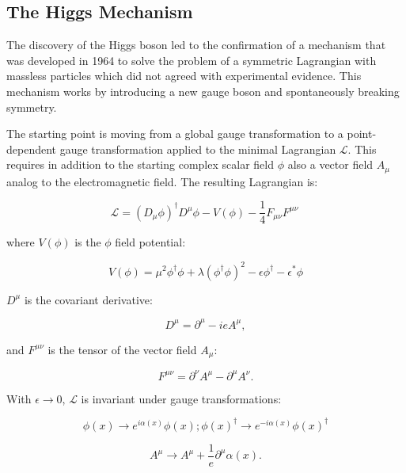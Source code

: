 \subsection{The Higgs Mechanism}
\label{higgs_mechanism}

The discovery of the Higgs boson led to the confirmation of a mechanism that was developed in 1964 to solve the problem of a symmetric Lagrangian with massless particles which did not agreed with experimental evidence. This mechanism works by introducing a new gauge boson and spontaneously breaking symmetry.

The starting point is moving from a global gauge transformation to a point-dependent gauge transformation applied to the minimal Lagrangian $\mathcal{L}$. This requires in addition to the starting complex scalar field $\phi$ also a vector field $A_{\mu}$ analog to the electromagnetic field. The resulting Lagrangian is:

\begin{equation}
\mathcal{L} = (D_{\mu}\phi)^{\dagger} D^{\mu}\phi - V (\phi) - \dfrac{1}{4}F_{\mu\nu}F^{\mu\nu}\
\label{eq::lagrangian_min}
\end{equation}

where $V(\phi)$ is the $\phi$ field potential:

\begin{equation}
V(\phi)=\mu^{2}\phi^{\dagger}\phi+\lambda(\phi^{\dagger}\phi)^{2} -\epsilon\phi^{\dagger} -\epsilon^{*}\phi
\end{equation}

$D^{\mu}$ is the covariant derivative:

\begin{equation}
D^{\mu} = \partial^{\mu} - ieA^{\mu},
\end{equation}

and $F^{\mu\nu}$ is the tensor of the vector field $A_{\mu}$:

\begin{equation}
F^{\mu\nu} =\partial^{\nu}A^{\mu} - \partial^{\mu}A^{\nu}.
\end{equation}

With $\epsilon \rightarrow 0$, $\mathcal{L}$ is invariant under gauge transformations:

\begin{equation}
\phi(x) \rightarrow e^{i\alpha(x)}\phi(x); \phi(x)^{\dagger} \rightarrow e ^{-i\alpha(x)}\phi(x)^{\dagger}
\end{equation}

\begin{equation}
A^{\mu} \rightarrow A^{\mu} + \dfrac{1}{e}\partial^{\mu}\alpha(x).
\label{eq::a_tranform}
\end{equation}

